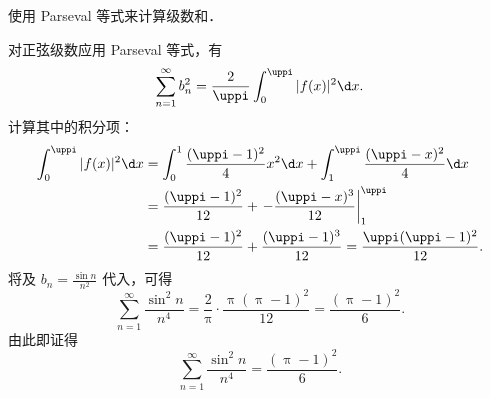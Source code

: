\begin{myproof}
    使用 Parseval 等式来计算级数和．

    对正弦级数应用 Parseval 等式，有
    \begin{equation}\label{eq:parseval-sine}
        \sum_{n=1}^{\infty} b_n^2 = \frac{2}{\uppi} \int_{0}^{\uppi} |f(x)|^2 \d x.
    \end{equation}
    计算其中的积分项：
    \begin{equation}\label{eq:parseval-int}
        \begin{aligned}
            \int_{0}^{\uppi} |f(x)|^2 \d x & = \int_{0}^{1} \frac{(\uppi-1)^2}{4} x^2 \d x + \int_{1}^{\uppi} \frac{(\uppi-x)^2}{4} \d x \\
                                           & = \frac{(\uppi-1)^2}{12} + \left. -\frac{(\uppi-x)^3}{12} \right|_{1}^{\uppi}               \\
                                           & = \frac{(\uppi-1)^2}{12} + \frac{(\uppi-1)^3}{12} = \frac{\uppi(\uppi-1)^2}{12}.
        \end{aligned}
    \end{equation}
    将及 $b_n = \frac{\sin n}{n^2}$ 代入，可得
    \begin{equation}\label{eq:parseval-final}
        \sum_{n=1}^{\infty} \frac{\sin^2 n}{n^4} = \frac{2}{\uppi} \cdot \frac{\uppi(\uppi-1)^2}{12} = \frac{(\uppi-1)^2}{6}.
    \end{equation}
    由此即证得
    \begin{equation}
        \sum_{n=1}^{\infty} \frac{\sin^2 n}{n^4} = \frac{(\uppi-1)^2}{6}.
    \end{equation}
\end{myproof}

\endinput
